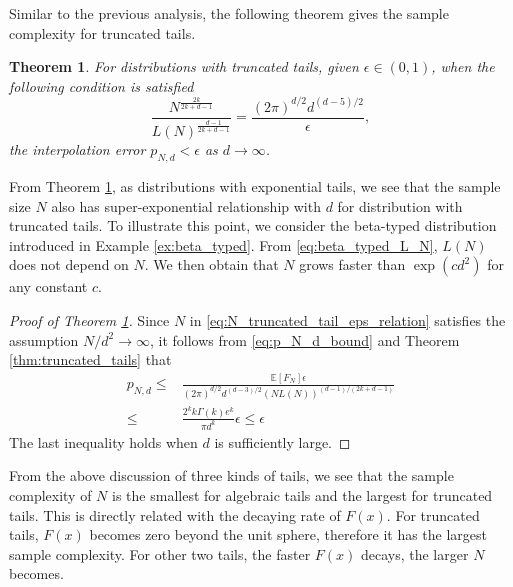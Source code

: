 \documentclass[conference,a4paper]{IEEEtran}
\def\E{\mathbb{E}}
\newtheorem{theorem}{Theorem}
\begin{document}
 Similar to the previous analysis,
 the following theorem gives the sample complexity for truncated tails.
 \begin{theorem}\label{thm:truncated_tails_sample}
  For distributions with truncated tails,
  given $\epsilon \in (0,1)$,
  when the following condition is satisfied
  \begin{equation}\label{eq:N_truncated_tail_eps_relation}
    \frac{N^{\frac{2k}{2k+d-1}}}{L(N)^{\frac{d-1}{2k+d-1}}} 
        =\frac{(2\pi)^{d/2}d^{(d-5)/2}}{\epsilon},
  \end{equation}
  the interpolation error $p_{N,d} < \epsilon$ as $d\to \infty$.
\end{theorem}
From Theorem \ref{thm:truncated_tails_sample}, as
distributions with exponential tails, we see that
the sample size $N$ also has super-exponential relationship
with $d$ for distribution with truncated tails.
To illustrate this point, we consider the beta-typed distribution introduced
in Example \ref{ex:beta_typed}.
From \eqref{eq:beta_typed_L_N}, $L(N)$ does not depend on $N$.
We then obtain that $N$ grows faster than $\exp(cd^2)$ for any constant $c$.
\begin{proof}[Proof of Theorem \ref{thm:truncated_tails_sample}]
     Since $N$ in \eqref{eq:N_truncated_tail_eps_relation} satisfies the assumption $N/d^2 \to \infty$,
     it follows from \eqref{eq:p_N_d_bound} and Theorem \ref{thm:truncated_tails} that
     \begin{align*}
     p_{N,d} \leq &\frac{\E[F_N]\epsilon}{(2\pi)^{d/2} d^{(d-3)/2} (NL(N))^{(d-1)/(2k+d-1)}}\\
     \leq & \frac{2^k k\Gamma(k)e^k}{\pi d^k} \epsilon \leq \epsilon
     \end{align*}
     The last inequality holds when $d$ is sufficiently large.
\end{proof}
From the above discussion of three kinds of tails, we see that the sample complexity of $N$ is the smallest for algebraic tails and the largest
for truncated tails. This is directly related with the decaying rate of $F(x)$.
For truncated tails, $F(x)$ becomes zero beyond the unit sphere, therefore it has the largest sample complexity.
For other two tails, the faster $F(x)$ decays, the larger $N$ becomes.

\end{document}
